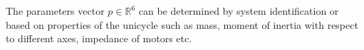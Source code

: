 \documentclass[letterpaper, 10 pt, conference]{ieeeconf}  %
\begin{document}
%

%

The parameters vector $p \in \mathds{R}^6$ can be determined by system identification or based on properties of the unicycle such as mass, moment of inertia with respect to different axes, impedance of motors etc.

\end{document}
